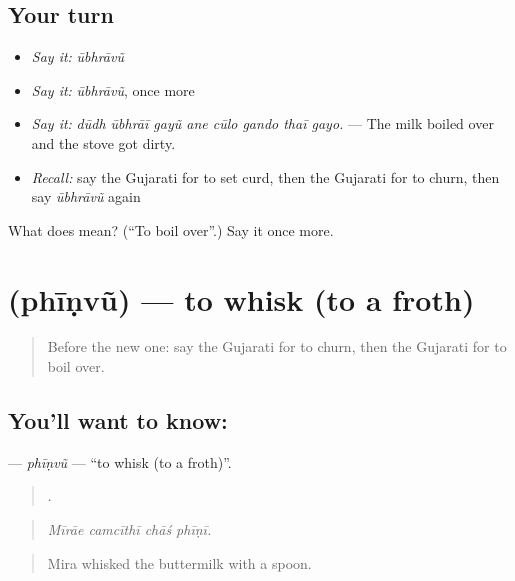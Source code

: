\subsection*{Your turn}
\begin{itemize}
\raggedright
  \item \emph{Say it:} \emph{ūbhrāvũ}
  \item \emph{Say it:} \emph{ūbhrāvũ}, once more
  \item \emph{Say it:} \emph{dūdh ūbhrāī gayũ ane cūlo gando thaī gayo.} — The milk boiled over and the stove got dirty.
  \item \emph{Recall:} say the Gujarati for to set curd, then the Gujarati for to churn, then say \emph{ūbhrāvũ} again
\end{itemize}

\begin{tcolorbox}[breakable,colback=teal!4,colframe=teal!35!black,title={Before you move on}]
What does  mean? (\textquotedblleft{}To boil over\textquotedblright{}.) Say it once more.
\end{tcolorbox}
\section[\texorpdfstring{\gu{ફીણવું} (phīṇvũ)}{ફીણવું (phīṇvũ)}]{ (phīṇvũ) — to whisk (to a froth)}

\label{lesson:GU-C521-phinvu}



\begin{quote}
Before the new one: say the Gujarati for to churn, then the Gujarati for to boil over.
\end{quote}

\subsection*{You'll want to know: }
\textbf{} — \emph{phīṇvũ} — \textquotedblleft{}to whisk (to a froth)\textquotedblright{}.

\begin{quote}
   .
\end{quote}

\begin{quote}
\emph{Mīrāe camcīthī chāś phīṇī.}
\end{quote}

\begin{quote}
Mira whisked the buttermilk with a spoon.
\end{quote}


